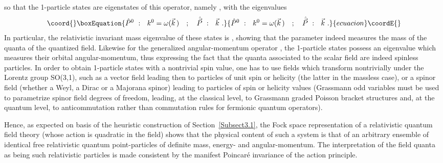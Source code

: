 \documentclass[a4paper,11pt]{article}
\begin{document}
so that the 1-particle states \coordHE{} are eigenstates of
this operator, namely \coordHE{}, with the
eigenvalues
\begin{equation}\coord{}\boxEquation{
\hat{P}^0\ :\ \ k^0=\omega(\vec{k}\,)\ \ \ ;\ \ \
\hat{\vec{P}}\ :\ \ \vec{k}\ .
}{
\hat{P}^0\ :\ \ k^0=\omega(\vec{k}\,)\ \ \ ;\ \ \
\hat{\vec{P}}\ :\ \ \vec{k}\ .
}{ecuacion}\coordE{}\end{equation}
In particular, the relativistic invariant mass eigenvalue of
these states is \myHighlight{$m^2$}\coordHE{}, showing that the parameter \coordHE{} indeed
measures the mass of the quanta of the quantized field.
Likewise for the generalized angular-momentum operator \myHighlight{$\hat{M}^{\mu\nu}$}\coordHE{},
the 1-particle states \myHighlight{$|\vec{k}>$}\coordHE{} possess an eigenvalue which measures
their orbital angular-momentum, thus expressing the fact that the
quanta associated to the scalar field \myHighlight{$\phi(x^\mu)$}\coordHE{} are indeed
spinless particles. In order to obtain 1-particle states with a
nontrivial spin value, one has to use fields which transform
nontrivially under the Lorentz group SO(3,1), such as a vector field
lea\-ding then to particles of unit spin or helicity (the latter in the
massless case), or a spinor field (whether a Weyl, a Dirac or a Majorana
spinor) leading to particles of \myHighlight{$1/2$}\coordHE{} spin or helicity values (Grassmann odd 
variables must be used to parametrize spinor field degrees of freedom, 
leading, at the classical level, to Grassmann graded Poisson bracket
structures and, at the quantum level, to anticommutation rather than
commutation rules for fermionic quantum operators).

Hence, as expected on basis of the heuristic construction of 
Section~\ref{Subsect3.1}, the Fock space representation of a
relativistic quantum field theory (whose action is quadratic
in the field) shows that the physical content of such a system
is that of an arbitrary ensemble of identical free relativistic quantum 
point-particles of definite mass, energy- and angular-momentum. 
The interpretation
of the field quanta as being such relativistic particles is made consistent 
by the manifest Poincar\'e invariance of the action principle. 
\end{document}
